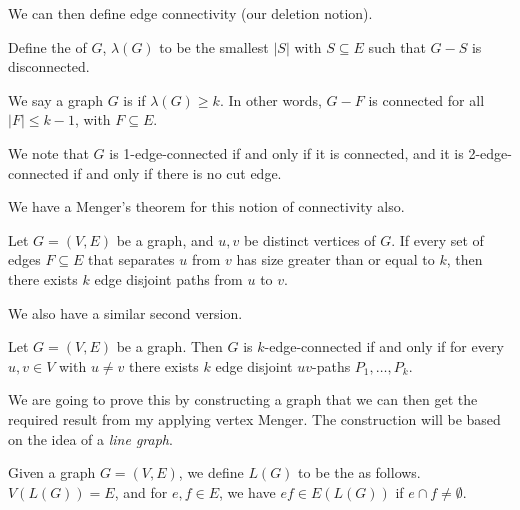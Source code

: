 \documentclass[a4paper]{scrreprt}
\begin{document}
We can then define edge connectivity (our deletion notion).

\begin{definition}
	Define the  of $G$, $\lambda(G)$ to be the smallest $|S|$ with $S \subseteq E$ such that $G - S$ is disconnected.
\end{definition}
\begin{definition}
	We say a graph $G$ is  if $\lambda(G) \geq k$. In other words, $G - F$ is connected for all $|F|\leq k - 1$, with $F \subseteq E$. 
\end{definition}

We note that $G$ is 1-edge-connected if and only if it is connected, and it is 2-edge-connected if and only if there is no cut edge.

We have a Menger's theorem for this notion of connectivity also.

\begin{theorem}
	Let $G = (V, E)$ be a graph, and $u, v$ be distinct vertices of $G$. If every set of edges $F \subseteq E$ that separates $u$ from $v$ has size greater than or equal to $k$, then there exists $k$ edge disjoint paths from $u$ to $v$.
\end{theorem}

We also have a similar second version.

\begin{theorem}
Let $G = (V, E)$ be a graph. Then $G$ is $k$-edge-connected if and only if for every $u, v \in V$ with $u \neq v$ there exists $k$ edge disjoint $uv$-paths $P_1, \dots, P_k$.
\end{theorem}

We are going to prove this by constructing a graph that we can then get the required result from my applying vertex Menger. The construction will be based on the idea of a \emph{line graph}.

\begin{definition}
	Given a graph $G = (V, E)$, we define $L(G)$ to be the  as follows.
	$V(L(G)) = E$, and for $e, f \in E$, we have $ef \in E(L(G))$ if $e \cap f \neq \emptyset$.
\end{definition}
\end{document}
